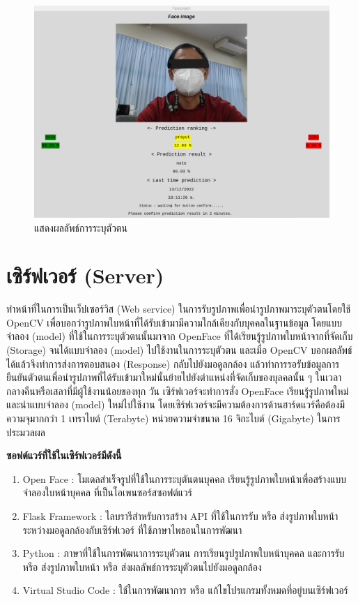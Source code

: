 \begin{figure}[!ht]
  \begin{center}
    \includegraphics[scale=.45]{pic/result_page_blind.png}
  \caption[แสดงผลลัพธ์การระบุตัวตน]{แสดงผลลัพธ์การระบุตัวตน}
  \end{center}
  \label{fig:predict_result}
\end{figure}


\section{เซิร์ฟเวอร์ (Server)}
ทำหน้าที่ในการเป็นเว็ปเซอร์วิส (Web service) ในการรับรูปภาพเพื่อนำรูปภาพมาระบุตัวตนโดยใช้ OpenCV
เพื่อบอกว่ารูปภาพใบหน้าที่ได้รับเข้ามามีความใกล้เคียงกับบุคคลในฐานข้อมูล โดยแบบจำลอง (model) ที่ใช้ในการระบุตัวตนนั้นมาจาก OpenFace ที่ได้เรียนรู้รูปภาพใบหน้าจากที่จัดเก็บ (Storage) 
จนได้แบบจำลอง (model) ไปใช้งานในการระบุตัวตน และเมื่อ OpenCV บอกผลลัพธ์ได้แล้วจึงทำการส่งการตอบสนอง (Response) 
กลับไปยังมอดูลกล้อง แล้วทำการรอรับข้อมูลการยืนยันตัวตนเพื่อนำรูปภาพที่ได้รับเข้ามาใหม่นั้นย้ายไปยังตำแหน่งที่จัดเก็บของบุลคลนั้น ๆ ในเวลากลางคืนหรือเสลาที่มีผู้ใช้งานน้อยของทุก 
วัน เซิร์ฟเวอร์จะทำการสั่ง OpenFace เรียนรู้รูปภาพใหม่ และนำแบบจำลอง (model) ใหม่ไปใช้งาน โดยเซิร์ฟเวอร์จะมีความต้องการด้านฮาร์ดแวร์คือต้องมีความจุมากกว่า 1 เทราไบต์  (Terabyte) 
หน่วยความจำขนาด 16 จิกะไบต์ (Gigabyte) ในการประมวลผล

\textbf{ซอฟต์แวร์ที่ใช้ในเซิร์ฟเวอร์มีดังนี้}
\begin{enumerate}
  \item Open Face : โมเดลสำเร็จรูปที่ใช้ในการระบุตันตนบุคคล เรียนรู้รูปภาพใบหน้าเพื่อสร้างแบบจำลองใบหน้าบุคคล ที่เป็นโอเพนซอร์สซอฟต์แวร์
  \item Flask Framework : ไลบรารีสำหรับการสร้าง API ที่ใช้ในการรับ หรือ ส่งรูปภาพใบหน้าระหว่างมอดูลกล้องกับเซิร์ฟเวอร์ ที่ใช้ภาษาไพธอนในการพัฒนา
  \item Python : ภาษาที่ใช้ในการพัฒนาการระบุตัวตน การเรียนรูปรูปภาพใบหน้าบุคคล และการรับ หรือ ส่งรูปภาพใบหน้า หรือ ส่งผลลัพธ์การระบุตัวตนไปยังมอดูลกล้อง
  \item Virtual Studio Code : ใช้ในการพัฒนาการ หรือ แก้ไขโปรแกรมทั้งหมดที่อยู่บนเซิร์ฟเวอร์
\end{enumerate}


